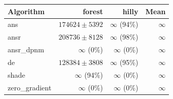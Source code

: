 \begin{tabular}{lrrr}
\toprule
Algorithm & forest & hilly & Mean \\
\midrule
ans & $174624 \pm 5392$ & $\infty$ (94\%) & $\infty$ \\
ansr & $208736 \pm 8128$ & $\infty$ (98\%) & $\infty$ \\
ansr\_dpnm & $\infty$ (0\%) & $\infty$ (0\%) & $\infty$ \\
de & $128384 \pm 3808$ & $\infty$ (95\%) & $\infty$ \\
shade & $\infty$ (94\%) & $\infty$ (0\%) & $\infty$ \\
zero\_gradient & $\infty$ (0\%) & $\infty$ (0\%) & $\infty$ \\
\bottomrule
\end{tabular}
